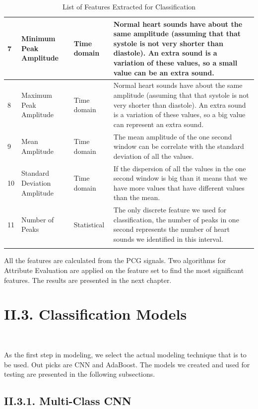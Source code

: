 \documentclass[11pt, a4papper]{report}
\theoremstyle{plain}
\theoremstyle{definition}
\theoremstyle{definition}
\theoremstyle{proposition}
\begin{document}
\begin{longtable}[!h]{ | m{0.6cm} | m{3cm}| m{3.2cm} | m{6.5cm} | }
\hline
7 & Minimum Peak Amplitude & Time domain & Normal heart sounds have about the same amplitude (assuming that that systole is not very shorter than diastole). An extra sound is a variation of these values, so a small value can be an extra sound. \\ 
\hline
8 & Maximum Peak Amplitude & Time domain & Normal heart sounds have about the same amplitude (assuming that that systole is not very shorter than diastole). An extra sound is a variation of these values, so a big value can represent an extra sound. \\ 
\hline
9 & Mean Amplitude & Time domain & The mean amplitude of the one second window can be correlate with the standard deviation of all the values.\\ 
\hline
10 & Standard Deviation Amplitude & Time domain &  If the dispersion of all the values in the one second window is big than it means that we have more values that have different values than the mean. \\ 
\hline
11 & Number of Peaks & Statistical & The only discrete feature we used for classification, the number of peaks in one second represents the number of heart sounds we identified in this interval.\\ 
\hline

\caption{List of Features Extracted for Classification}
\end{longtable}

All the features are calculated from the PCG signals. Two algorithms for Attribute Evaluation are applied on the feature set to find the most significant features. The results are presented in the next chapter. 
\
\newpage

\section*{II.3. Classification Models}

\

As the first step in modeling, we select the actual modeling technique that is to be used. Out picks are CNN and AdaBoost. The models we created and used for testing are presented in the following subsections.


\subsection*{II.3.1. Multi-Class CNN}
\end{document}
